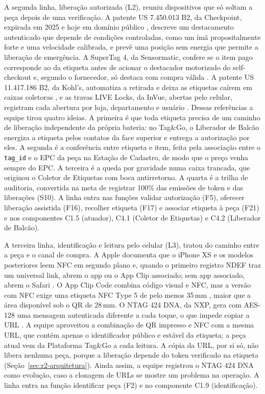 A segunda linha, liberação autorizada (L2), reuniu dispositivos que só soltam a peça depois de uma verificação. A patente US 7.450.013 B2, da Checkpoint, expirada em 2025 e hoje em domínio público \cite{googlepatents2008us7450013}, descreve um destacamento autenticado que depende de condições controladas, como um ímã propositalmente forte e uma velocidade calibrada, e prevê uma posição sem energia que permite a liberação de emergência. A SuperTag 4, da Sensormatic, confere se o item pago corresponde ao da etiqueta antes de acionar o destacador motorizado do self-checkout e, segundo o fornecedor, só destaca com compra válida \cite{sensormatic2026supertag}. A patente US 11.417.186 B2, da Kohl's, automatiza a retirada e deixa as etiquetas caírem em caixas coletoras \cite{googlepatents2022us11417186}, e as travas LIVE Locks, da InVue, abertas pelo celular, registram cada abertura por loja, departamento e usuário \cite{invue2026locks}. Dessas referências a equipe tirou quatro ideias. A primeira é que toda etiqueta precisa de um caminho de liberação independente da própria bateria: no Tag\&Go, o Liberador de Balcão energiza a etiqueta pelos contatos da face superior e entrega a autorização por eles. A segunda é a conferência entre etiqueta e item, feita pela associação entre o \texttt{tag\_id} e o EPC da peça na Estação de Cadastro, de modo que o preço venha sempre do EPC. A terceira é a queda por gravidade numa caixa trancada, que originou o Coletor de Etiquetas com boca antirretorno. A quarta é a trilha de auditoria, convertida na meta de registrar 100\% das emissões de token e das liberações (S10). A linha entra nas funções validar autorização (F5), oferecer liberação assistida (F16), recolher etiqueta (F17) e associar etiqueta à peça (F21) e nos componentes C1.5 (atuador), C4.1 (Coletor de Etiquetas) e C4.2 (Liberador de Balcão).

A terceira linha, identificação e leitura pelo celular (L3), tratou do caminho entre a peça e o canal de compra. A Apple documenta que o iPhone XS e os modelos posteriores leem NFC em segundo plano e, quando o primeiro registro NDEF traz um universal link, abrem o app ou o App Clip associado; sem app associado, abrem o Safari \cite{apple2026corenfc}. O App Clip Code combina código visual e NFC, mas a versão com NFC exige uma etiqueta NFC Type 5 de pelo menos 35\,mm \cite{apple2026appcliphig}, maior que a área disponível sob o QR de 28\,mm. O NTAG 424 DNA, da NXP, gera com AES-128 uma mensagem autenticada diferente a cada toque, o que impede copiar a URL \cite{nxp2026ntag424}. A equipe aproveitou a combinação de QR impresso e NFC com a mesma URL, que contém apenas o identificador público e estável da etiqueta; a peça atual vem da Plataforma Tag\&Go a cada leitura. A cópia da URL, por si só, não libera nenhuma peça, porque a liberação depende do token verificado na etiqueta (Seção~\ref{sec:r2-arquitetura}). Ainda assim, a equipe registrou o NTAG 424 DNA como evolução, caso a clonagem de URLs se mostre um problema na operação. A linha entra na função identificar peça (F2) e no componente C1.9 (identificação).

